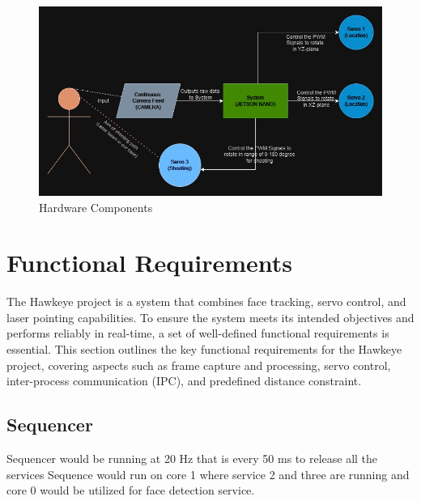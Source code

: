\documentclass[a4paper,11pt]{article}%
\begin{document}
\begin{figure}[H]
    \centering
    \includegraphics[scale=0.6]{figures/hw_overview.jpeg}
    \caption{Hardware Components}
\end{figure}

\section{Functional Requirements}
The Hawkeye project is a system that combines face tracking, servo control, and laser pointing capabilities. To ensure the system meets its intended objectives and performs reliably in real-time, a set of well-defined functional requirements is essential. This section outlines the key functional requirements for the Hawkeye project, covering aspects such as frame capture and processing, servo control, inter-process communication (IPC), and predefined distance constraint.
\subsection{Sequencer}
Sequencer would be running at 20 Hz that is every 50 ms to release all the services Sequence would run on core 1 where service 2 and three are running and core 0 would be utilized for face detection service.
\end{document}
